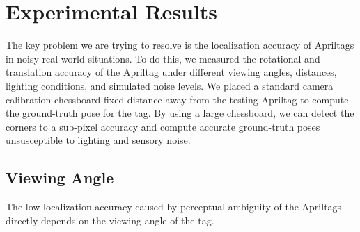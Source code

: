 \section{Experimental Results}
\label{sec:res}
The key problem we are trying to resolve is the localization accuracy of Apriltags in noisy real world situations. To do this, we measured the rotational and translation accuracy of the Apriltag under different viewing angles, distances, lighting conditions, and simulated noise levels. We placed a standard camera calibration chessboard fixed distance away from the testing Apriltag to compute the ground-truth pose for the tag. By using a large chessboard, we can detect the corners to a sub-pixel accuracy and compute accurate ground-truth poses unsusceptible to lighting and sensory noise.

\subsection{Viewing Angle}
The low localization accuracy caused by perceptual ambiguity of the Apriltags directly depends on the viewing angle of the tag.  